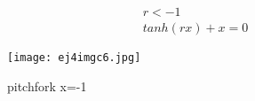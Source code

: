 \documentclass[a4paper,10pt]{article}
\begin{document}
\begin{enumerate}
\begin{enumerate}
                \begin{equation}
                    \begin{aligned}
                        r<-1\\
                        tanh(rx) + x=0
                    \end{aligned}
                \end{equation}
                \begin{figure}[h]
                    \centering
                    \texttt{[image: ej4imgc6.jpg]}
                    \caption{pitchfork x=-1}
                    \label{fig:mesh1}
                \end{figure}
               
        \end{enumerate}
        

\end{enumerate}
\end{document}
